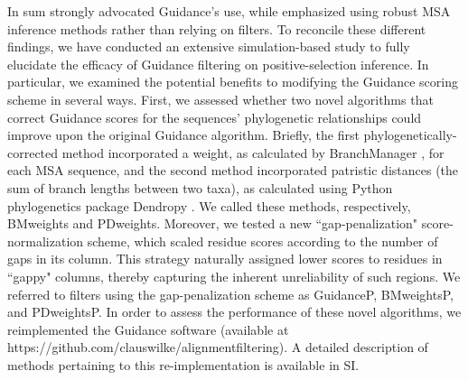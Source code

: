 \documentclass[11pt]{article}
\begin{document}
In sum \citet{Privman2012} strongly advocated Guidance's use, while \citet{Jordan2012} emphasized using robust MSA inference methods rather than relying on filters. To reconcile these different findings, we have conducted an extensive simulation-based study to fully elucidate the efficacy of Guidance filtering on positive-selection inference. In particular, we examined the potential benefits to modifying the Guidance scoring scheme in several ways.  First, we assessed whether two novel algorithms that correct Guidance scores for the sequences' phylogenetic relationships could improve upon the original Guidance algorithm. Briefly, the first phylogenetically-corrected method incorporated a weight, as calculated by BranchManager \citep{Stone2007}, for each MSA sequence, and the second method incorporated patristic distances (the sum of branch lengths between two taxa), as calculated using Python phylogenetics package Dendropy \citep{Sukumaran2010}. We called these methods, respectively, BMweights and PDweights. Moreover, we tested a new ``gap-penalization" score-normalization scheme, which scaled residue scores according to the number of gaps in its column. This strategy naturally assigned lower scores to residues in ``gappy" columns, thereby capturing the inherent unreliability of such regions. We referred to filters using the gap-penalization scheme as GuidanceP, BMweightsP, and PDweightsP. In order to assess the performance of these novel algorithms, we reimplemented the Guidance software (available at https://github.com/clauswilke/alignment\underline{\hspace*{0.2cm}}filtering). A detailed description of methods pertaining to this re-implementation is available in SI.
\end{document}
